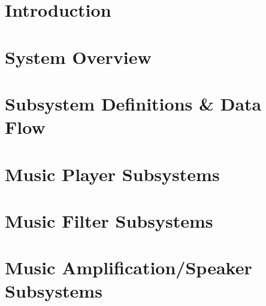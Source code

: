 \documentclass[11pt,letterpaper]{article}
\begin{document}
\setcounter{tocdepth}{2}
\tableofcontents
\newpage

\listoffigures
\listoftables
\newpage

\section{Introduction}

\newpage
\section{System Overview}

\newpage
\section{Subsystem Definitions \& Data Flow}

\newpage
\section{Music Player Subsystems}

\newpage
\section{Music Filter Subsystems}

\newpage
\section{Music Amplification/Speaker Subsystems}

\newpage



{}
\end{document}
